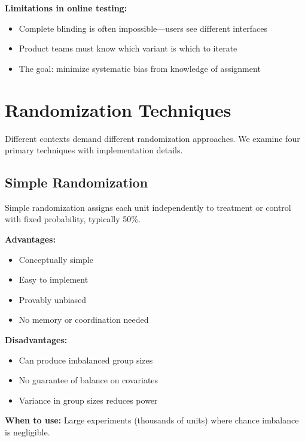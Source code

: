 \textbf{Limitations in online testing:}

\begin{itemize}
    \item Complete blinding is often impossible—users see different interfaces
    \item Product teams must know which variant is which to iterate
    \item The goal: minimize systematic bias from knowledge of assignment
\end{itemize}

\section{Randomization Techniques}

Different contexts demand different randomization approaches. We examine four primary techniques with implementation details.

\subsection{Simple Randomization}

Simple randomization assigns each unit independently to treatment or control with fixed probability, typically 50\%.

\textbf{Advantages:}
\begin{itemize}
    \item Conceptually simple
    \item Easy to implement
    \item Provably unbiased
    \item No memory or coordination needed
\end{itemize}

\textbf{Disadvantages:}
\begin{itemize}
    \item Can produce imbalanced group sizes
    \item No guarantee of balance on covariates
    \item Variance in group sizes reduces power
\end{itemize}

\textbf{When to use:} Large experiments (thousands of units) where chance imbalance is negligible.

